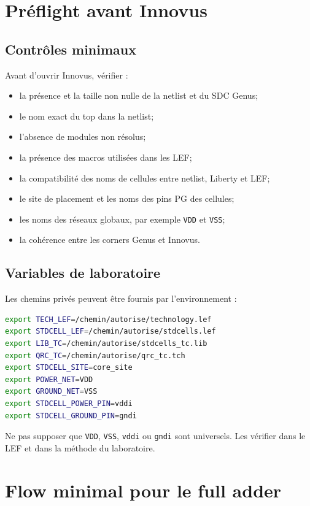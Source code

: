 \documentclass[11pt,a4paper,openany]{report}
\begin{document}
\chapter{Préflight avant Innovus}

\section{Contrôles minimaux}

Avant d'ouvrir Innovus, vérifier :

\begin{itemize}
  \item la présence et la taille non nulle de la netlist et du SDC Genus;
  \item le nom exact du top dans la netlist;
  \item l'absence de modules non résolus;
  \item la présence des macros utilisées dans les LEF;
  \item la compatibilité des noms de cellules entre netlist, Liberty et LEF;
  \item le site de placement et les noms des pins PG des cellules;
  \item les noms des réseaux globaux, par exemple \texttt{VDD} et \texttt{VSS};
  \item la cohérence entre les corners Genus et Innovus.
\end{itemize}

\section{Variables de laboratoire}

Les chemins privés peuvent être fournis par l'environnement :

\begin{lstlisting}[style=guidecode,language=bash]
export TECH_LEF=/chemin/autorise/technology.lef
export STDCELL_LEF=/chemin/autorise/stdcells.lef
export LIB_TC=/chemin/autorise/stdcells_tc.lib
export QRC_TC=/chemin/autorise/qrc_tc.tch
export STDCELL_SITE=core_site
export POWER_NET=VDD
export GROUND_NET=VSS
export STDCELL_POWER_PIN=vddi
export STDCELL_GROUND_PIN=gndi
\end{lstlisting}

Ne pas supposer que \texttt{VDD}, \texttt{VSS}, \texttt{vddi} ou
\texttt{gndi} sont universels. Les vérifier dans le LEF et dans la méthode du
laboratoire.

\chapter{Flow minimal pour le full adder}
\end{document}

